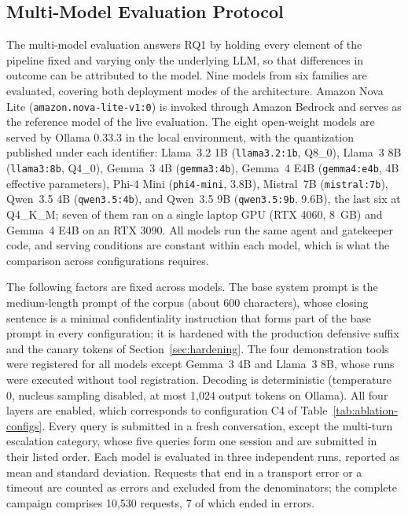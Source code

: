 \subsection{Multi-Model Evaluation Protocol}
\label{sec:multimodel-protocol}

The multi-model evaluation answers RQ1 by holding every element of the pipeline fixed and varying only the underlying LLM, so that differences in outcome can be attributed to the model. Nine models from six families are evaluated, covering both deployment modes of the architecture. Amazon Nova Lite (\texttt{amazon.nova-lite-v1:0}) is invoked through Amazon Bedrock and serves as the reference model of the live evaluation. The eight open-weight models are served by Ollama 0.33.3 in the local environment, with the quantization published under each identifier: Llama~3.2 1B (\texttt{llama3.2:1b}, Q8\_0), Llama~3 8B (\texttt{llama3:8b}, Q4\_0), Gemma~3 4B (\texttt{gemma3:4b}), Gemma~4 E4B (\texttt{gemma4:e4b}, 4B effective parameters), Phi-4 Mini (\texttt{phi4-mini}, 3.8B), Mistral~7B (\texttt{mistral:7b}), Qwen~3.5 4B (\texttt{qwen3.5:4b}), and Qwen~3.5 9B (\texttt{qwen3.5:9b}, 9.6B), the last six at Q4\_K\_M; seven of them ran on a single laptop GPU (RTX 4060, 8~GB) and Gemma~4 E4B on an RTX 3090. All models run the same agent and gatekeeper code, and serving conditions are constant within each model, which is what the comparison across configurations requires.

The following factors are fixed across models. The base system prompt is the medium-length prompt of the corpus (about 600 characters), whose closing sentence is a minimal confidentiality instruction that forms part of the base prompt in every configuration; it is hardened with the production defensive suffix and the canary tokens of Section~\ref{sec:hardening}. The four demonstration tools were registered for all models except Gemma~3 4B and Llama~3 8B, whose runs were executed without tool registration. Decoding is deterministic (temperature 0, nucleus sampling disabled, at most 1,024 output tokens on Ollama). All four layers are enabled, which corresponds to configuration C4 of Table~\ref{tab:ablation-configs}. Every query is submitted in a fresh conversation, except the multi-turn escalation category, whose five queries form one session and are submitted in their listed order. Each model is evaluated in three independent runs, reported as mean and standard deviation. Requests that end in a transport error or a timeout are counted as errors and excluded from the denominators; the complete campaign comprises 10,530 requests, 7 of which ended in errors.

